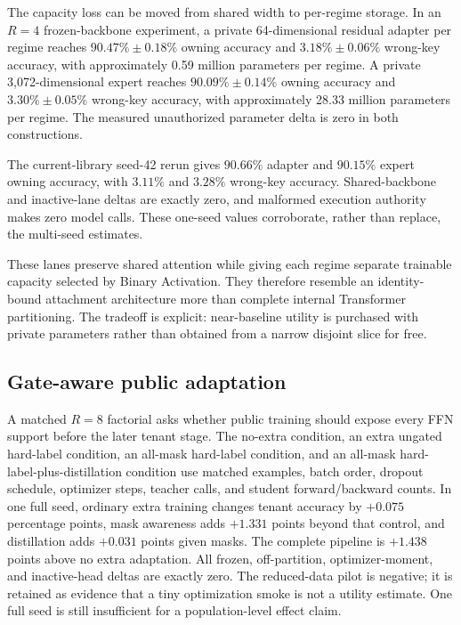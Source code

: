 \documentclass[11pt]{article}
\begin{document}
The capacity loss can be moved from shared width to per-regime storage. In an
$R=4$ frozen-backbone experiment, a private 64-dimensional residual adapter per
regime reaches $90.47\%\pm0.18\%$ owning accuracy and $3.18\%\pm0.06\%$
wrong-key accuracy, with approximately 0.59 million parameters per regime. A
private 3,072-dimensional expert reaches $90.09\%\pm0.14\%$ owning accuracy and
$3.30\%\pm0.05\%$ wrong-key accuracy, with approximately 28.33 million
parameters per regime. The measured unauthorized parameter delta is zero in
both constructions.

The current-library seed-42 rerun gives $90.66\%$ adapter and $90.15\%$
expert owning accuracy, with $3.11\%$ and $3.28\%$ wrong-key accuracy.
Shared-backbone and inactive-lane deltas are exactly zero, and malformed
execution authority makes zero model calls. These one-seed values corroborate,
rather than replace, the multi-seed estimates.

These lanes preserve shared attention while giving each regime separate
trainable capacity selected by Binary Activation. They therefore resemble an
identity-bound attachment architecture more than complete internal Transformer
partitioning. The tradeoff is explicit: near-baseline utility is purchased with
private parameters rather than obtained from a narrow disjoint slice for free.

\subsection{Gate-aware public adaptation}

A matched $R=8$ factorial asks whether public training should expose every
FFN support before the later tenant stage. The no-extra condition, an
extra ungated hard-label condition, an all-mask hard-label condition, and an
all-mask hard-label-plus-distillation condition use matched examples, batch
order, dropout schedule, optimizer steps, teacher calls, and student
forward/backward counts. In one full seed, ordinary extra training changes
tenant accuracy by $+0.075$ percentage points, mask awareness adds $+1.331$
points beyond that control, and distillation adds $+0.031$ points given masks.
The complete pipeline is $+1.438$ points above no extra adaptation. All frozen,
off-partition, optimizer-moment, and inactive-head deltas are exactly zero.
The reduced-data pilot is negative; it is retained as evidence that a tiny
optimization smoke is not a utility estimate. One full seed is still
insufficient for a population-level effect claim.
\end{document}
